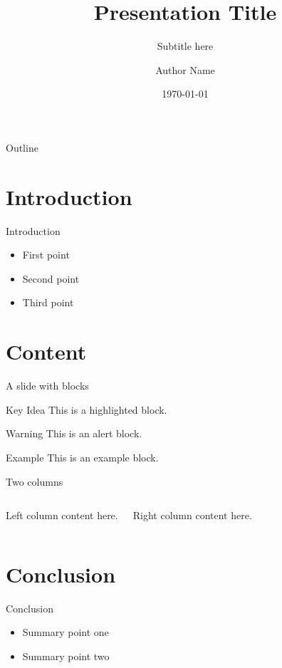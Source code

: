\documentclass{beamer}
\title{Presentation Title}
\subtitle{Subtitle here}
\author{Author Name}
\institute{Superteam Poland}
\date{\today}
\begin{document}
\begin{frame}
  \titlepage
\end{frame}

\begin{frame}{Outline}
  \tableofcontents
\end{frame}

\section{Introduction}

\begin{frame}{Introduction}
  \begin{itemize}
    \item First point
    \item Second point
    \item Third point
  \end{itemize}
\end{frame}

\section{Content}

\begin{frame}{A slide with blocks}
  \begin{block}{Key Idea}
    This is a highlighted block.
  \end{block}

  \begin{alertblock}{Warning}
    This is an alert block.
  \end{alertblock}

  \begin{exampleblock}{Example}
    This is an example block.
  \end{exampleblock}
\end{frame}

\begin{frame}{Two columns}
  \begin{columns}
      Left column content here.

      Right column content here.
  \end{columns}
\end{frame}

\section{Conclusion}

\begin{frame}{Conclusion}
  \begin{itemize}
    \item Summary point one
    \item Summary point two
  \end{itemize}
\end{frame}
\end{document}
